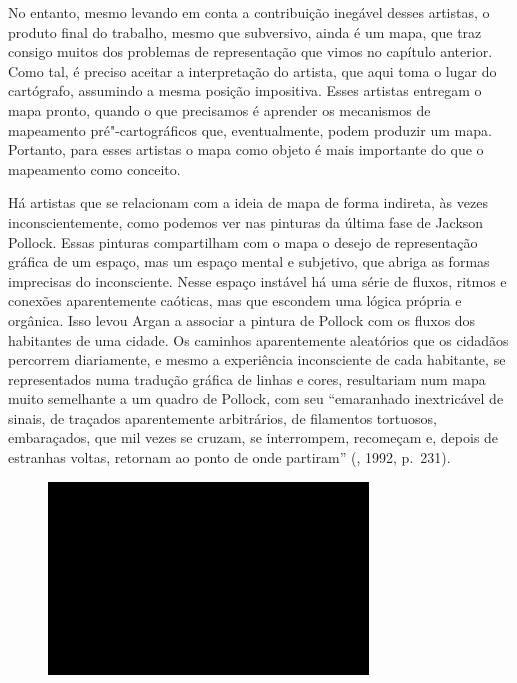 No entanto, mesmo levando em conta a contribuição inegável desses
artistas, o produto final do trabalho, mesmo que subversivo, ainda é um
mapa, que traz consigo muitos dos problemas de representação que vimos
no capítulo anterior. Como tal, é preciso aceitar a interpretação do
artista, que aqui toma o lugar do cartógrafo, assumindo a mesma posição
impositiva. Esses artistas entregam o mapa pronto, quando o que
precisamos é aprender os mecanismos de mapeamento pré"-cartográficos que,
eventualmente, podem produzir um mapa. Portanto, para esses artistas o
mapa como objeto é mais importante do que o mapeamento como conceito.

Há artistas que se relacionam com a ideia de mapa de forma indireta, às
vezes inconscientemente, como podemos ver nas pinturas da última fase de
Jackson Pollock. Essas pinturas compartilham com o mapa o desejo de
representação gráfica de um espaço, mas um espaço mental e subjetivo,
que abriga as formas imprecisas do inconsciente. Nesse espaço instável
há uma série de fluxos, ritmos e conexões aparentemente caóticas, mas
que escondem uma lógica própria e orgânica. Isso levou Argan a associar
a pintura de Pollock com os fluxos dos habitantes de uma cidade. Os
caminhos aparentemente aleatórios que os cidadãos percorrem diariamente,
e mesmo a experiência inconsciente de cada habitante, se representados
numa tradução gráfica de linhas e cores, resultariam num mapa muito
semelhante a um quadro de Pollock, com seu ``emaranhado inextricável de
sinais, de traçados aparentemente arbitrários, de filamentos tortuosos,
embaraçados, que mil vezes se cruzam, se interrompem, recomeçam e,
depois de estranhas voltas, retornam ao ponto de onde partiram''
(, 1992, p.~231).

\begin{figure}[!ht]

\centering
 \includegraphics[width=85mm]{./imgs/im1.jpg}
\caption{\tiny{}}

\end{figure}

